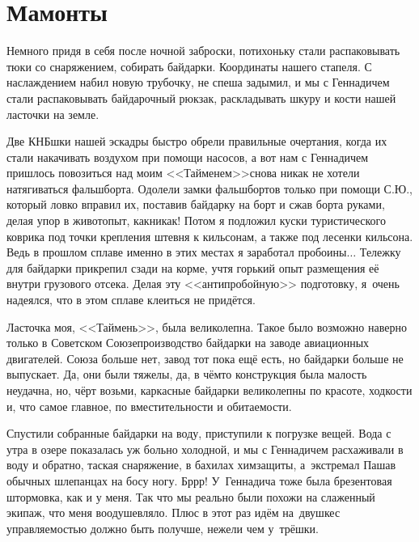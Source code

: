 \chapter{Мамонты} 

Немного придя в себя после ночной заброски, потихоньку стали распаковывать тюки со снаряжением, собирать байдарки. Координаты нашего стапеля\mdash \CoordsGorunSixteenStapel. С наслаждением  набил новую трубочку, не спеша задымил, и мы с Геннадичем стали распаковывать байдарочный рюкзак, раскладывать шкуру и кости нашей ласточки на земле. 

Две КНБ\sdash шки нашей эскадры быстро обрели правильные очертания, когда их стали накачивать воздухом при помощи насосов, а вот нам с Геннадичем пришлось повозиться над моим <<Тайменем>>\mdash снова никак не хотели натягиваться фальшборта. Одолели замки фальшбортов только при помощи С.Ю., который ловко вправил их, поставив байдарку на борт и сжав борта руками, делая упор в живот\mdash опыт, как\sdash никак! 
\newpage
Потом я подложил куски туристического коврика под точки крепления штевня к кильсонам, а также под лесенки кильсона. Ведь в прошлом сплаве именно в этих местах я заработал пробоины$\ldots$ Тележку для байдарки прикрепил сзади на корме, учтя горький опыт размещения её внутри грузового отсека. Делая эту <<антипробойную>> подготовку, я~очень надеялся, что в этом сплаве клеиться не придётся. 

Ласточка моя, <<Таймень>>, была великолепна. Такое было возможно наверно только в Советском Союзе\mdash производство байдарки на заводе авиационных двигателей. Союза больше нет, завод тот пока ещё есть, но байдарки больше не выпускает. Да, они были тяжелы, да, в чём\sdash то конструкция была малость неудачна, но, чёрт возьми, каркасные байдарки великолепны по красоте, ходкости и, что самое главное, по вместительности и обитаемости.

Спустили собранные байдарки на воду, приступили к погрузке вещей. Вода с утра в озере показалась уж больно холодной, и мы с Геннадичем расхаживали в воду и обратно, таская снаряжение, в бахилах химзащиты, а~экстремал Паша\mdash в обычных шлепанцах на босу ногу. Бр\sdash р\sdash р! У~Геннадича тоже была брезентовая штормовка, как и у меня. Так что мы реально были похожи на слаженный экипаж, что меня воодушевляло. Плюс в этот раз идём на~двушке\mdash с управляемостью должно быть получше, нежели чем у~трёшки.

